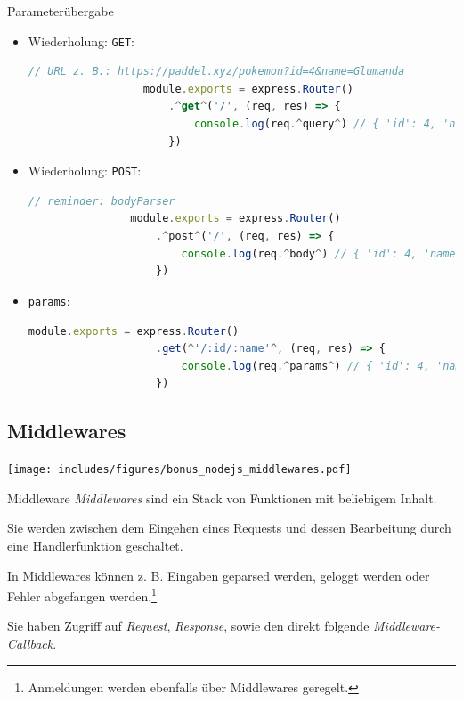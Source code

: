 \begin{bonus}{Parameterübergabe}
    \begin{itemize}
        \item Wiederholung: \texttt{GET}:

              \begin{lstlisting}[language=JavaScript]
                  // URL z. B.: https://paddel.xyz/pokemon?id=4&name=Glumanda
                  module.exports = express.Router()
                      .^get^('/', (req, res) => {
                          console.log(req.^query^) // { 'id': 4, 'name': 'Glumanda' }
                      })
              \end{lstlisting}
        \item Wiederholung: \texttt{POST}:

              \begin{lstlisting}[language=JavaScript]
                // reminder: bodyParser
                module.exports = express.Router()
                    .^post^('/', (req, res) => {
                        console.log(req.^body^) // { 'id': 4, 'name': 'Glumanda' }
                    })
            \end{lstlisting}
        \item \texttt{params}:

              \begin{lstlisting}[language=JavaScript]
                module.exports = express.Router()
                    .get(^'/:id/:name'^, (req, res) => {
                        console.log(req.^params^) // { 'id': 4, 'name': 'Glumanda' }
                    })
            \end{lstlisting}
    \end{itemize}
\end{bonus}

\subsection{Middlewares}

\begin{center}
    \texttt{[image: includes/figures/bonus\_nodejs\_middlewares.pdf]}
\end{center}

\begin{defi}{Middleware}
    \emph{Middlewares} sind ein Stack von Funktionen mit beliebigem Inhalt.

    Sie werden zwischen dem Eingehen eines Requests und dessen Bearbeitung durch eine Handlerfunktion geschaltet.

    In Middlewares können z. B. Eingaben geparsed werden, geloggt werden oder Fehler abgefangen werden.\footnote{Anmeldungen werden ebenfalls über Middlewares geregelt.}

    Sie haben Zugriff auf \emph{Request}, \emph{Response}, sowie den direkt folgende \emph{Middleware-Callback}.
\end{defi}


